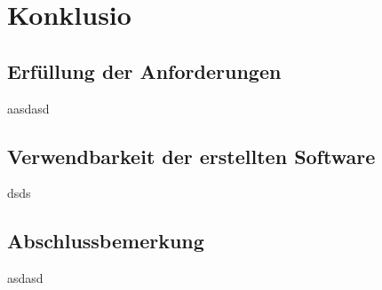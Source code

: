 \chapter{Konklusio}\label{chap:Konklusio}
\chapterstart
\section{Erfüllung der Anforderungen}
aasdasd
\section{Verwendbarkeit der erstellten Software}
dsds
\section{Abschlussbemerkung}
asdasd
\chapterend

